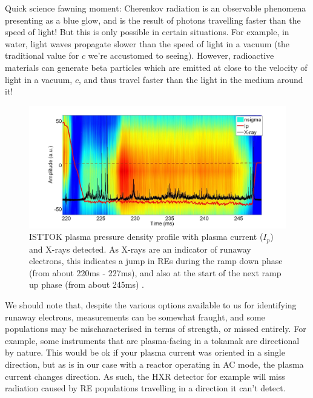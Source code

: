 \begin{remark}
    Quick science fawning moment: Cherenkov radiation is an observable phenomena presenting as a blue 
    glow, and is the result of photons travelling faster than the speed of light! But this is only possible 
    in certain situations. For example, in water, light waves propagate slower than the speed of light in a vacuum
    (the traditional value for $c$ we're accustomed to seeing).
    However, radioactive materials can generate beta particles which are emitted at close to the velocity of light 
    in a vacuum, $c$, and thus travel faster than the light in the medium around it! \cite{nobel-cherenkov}
\end{remark}

\begin{figure}[h!]
    \centering
    \includegraphics[scale=0.9]{imgs/c2/re-presence.png}
    \caption{ISTTOK plasma pressure density profile with plasma current ($I_p$) and X-rays detected. As X-rays are 
    an indicator of runaway electrons, this indicates a jump in REs during the ramp down phase (from about 
    220ms - 227ms), and also 
    at the start of the next ramp up phase (from about 245ms) \cite{malaquias-matthew}.}
\end{figure}

We should note that, despite the various options available to us for identifying runaway electrons, 
measurements can be somewhat fraught, and some populations may be mischaracterised in terms of strength, or 
missed entirely. For example, some instruments that are plasma-facing in a tokamak are directional by nature. This would 
be ok if your plasma current was oriented in a single direction, but as is in our case with a reactor operating 
in AC mode, the plasma current changes direction. As such, the HXR detector for example will miss radiation 
caused by RE populations travelling in a direction it can't detect. 